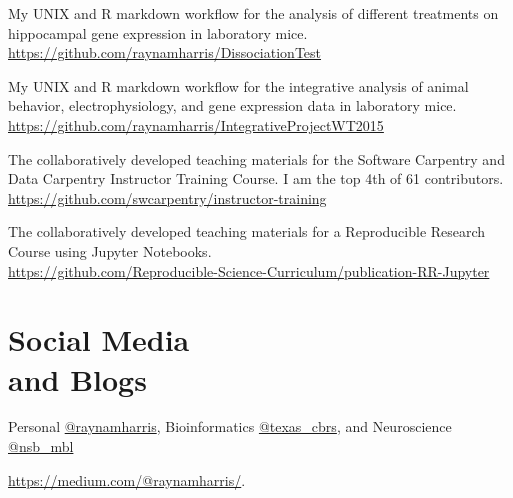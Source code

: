 \documentclass[margin,line]{resume}
\begin{document}
\begin{resume}
\begin{description}
\setlength{\itemsep}{3pt}
\item [\href{https://github.com/raynamharris/DissociationTest}{DissociationTest}] My UNIX and R markdown workflow for the analysis of different treatments on hippocampal gene expression in laboratory mice.\\  \url{https://github.com/raynamharris/DissociationTest}
\item [\href{https://github.com/raynamharris/IntegrativeProjectWT2015}{IntegrativeProjectWT2015}] My UNIX and R markdown workflow for the integrative analysis of animal behavior, electrophysiology, and gene expression data in laboratory mice. \\ \url{https://github.com/raynamharris/IntegrativeProjectWT2015}
\item [\href{https://github.com/swcarpentry/instructor-training}{instructor-training}] The collaboratively developed teaching materials for the Software Carpentry and Data Carpentry Instructor Training Course. I am the top 4th of 61 contributors. \\ \url{https://github.com/swcarpentry/instructor-training}
\item [\href{https://github.com/Reproducible-Science-Curriculum/publication-RR-Jupyter}{publication-RR-Jupyter}] The collaboratively developed teaching materials for a Reproducible Research Course using Jupyter Notebooks.\\ \url{https://github.com/Reproducible-Science-Curriculum/publication-RR-Jupyter}

\end{description}


\section{\mysidestyle Social Media\\and Blogs}

\begin{description}{}{
\setlength{\leftmargin}{1cm}%
\setlength{\itemindent}{-1cm}
}
\setlength{\itemsep}{3pt}
\item[Twitter:] Personal \href{http://twitter.com/raynamharris}{@raynamharris}, Bioinformatics \href{http://twitter.com/texas\_cbrs}{@texas\_cbrs}, and Neuroscience \href{http://twitter.com/nsb\_mbl}{@nsb\_mbl} 
\item[Professional/personal blog:]  \url{https://medium.com/@raynamharris/}. %


\end{description}
\end{resume}
\end{document}
